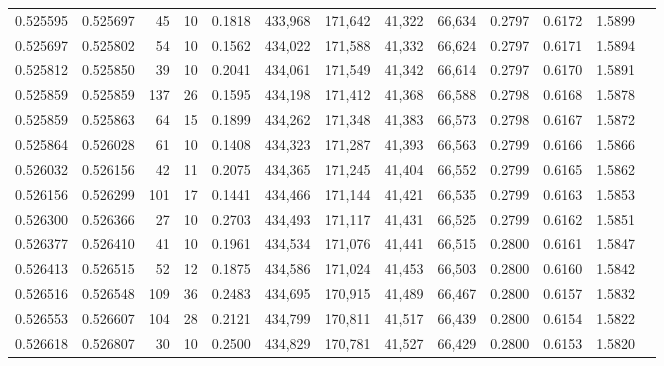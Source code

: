 \begin{tabular}{rrrrrrrrrrrrr}
0.525595 & 0.525697 &    45 &  10 &                                     0.1818 & 433,968 & 171,642 &  41,322 &  66,634 & 0.2797 & 0.6172 & 1.5899 \\
0.525697 & 0.525802 &    54 &  10 &                                     0.1562 & 434,022 & 171,588 &  41,332 &  66,624 & 0.2797 & 0.6171 & 1.5894 \\
0.525812 & 0.525850 &    39 &  10 &                                     0.2041 & 434,061 & 171,549 &  41,342 &  66,614 & 0.2797 & 0.6170 & 1.5891 \\
0.525859 & 0.525859 &   137 &  26 &                                     0.1595 & 434,198 & 171,412 &  41,368 &  66,588 & 0.2798 & 0.6168 & 1.5878 \\
0.525859 & 0.525863 &    64 &  15 &                                     0.1899 & 434,262 & 171,348 &  41,383 &  66,573 & 0.2798 & 0.6167 & 1.5872 \\
0.525864 & 0.526028 &    61 &  10 &                                     0.1408 & 434,323 & 171,287 &  41,393 &  66,563 & 0.2799 & 0.6166 & 1.5866 \\
0.526032 & 0.526156 &    42 &  11 &                                     0.2075 & 434,365 & 171,245 &  41,404 &  66,552 & 0.2799 & 0.6165 & 1.5862 \\
0.526156 & 0.526299 &   101 &  17 &                                     0.1441 & 434,466 & 171,144 &  41,421 &  66,535 & 0.2799 & 0.6163 & 1.5853 \\
0.526300 & 0.526366 &    27 &  10 &                                     0.2703 & 434,493 & 171,117 &  41,431 &  66,525 & 0.2799 & 0.6162 & 1.5851 \\
0.526377 & 0.526410 &    41 &  10 &                                     0.1961 & 434,534 & 171,076 &  41,441 &  66,515 & 0.2800 & 0.6161 & 1.5847 \\
0.526413 & 0.526515 &    52 &  12 &                                     0.1875 & 434,586 & 171,024 &  41,453 &  66,503 & 0.2800 & 0.6160 & 1.5842 \\
0.526516 & 0.526548 &   109 &  36 &                                     0.2483 & 434,695 & 170,915 &  41,489 &  66,467 & 0.2800 & 0.6157 & 1.5832 \\
0.526553 & 0.526607 &   104 &  28 &                                     0.2121 & 434,799 & 170,811 &  41,517 &  66,439 & 0.2800 & 0.6154 & 1.5822 \\
0.526618 & 0.526807 &    30 &  10 &                                     0.2500 & 434,829 & 170,781 &  41,527 &  66,429 & 0.2800 & 0.6153 & 1.5820 \\

\end{tabular}
